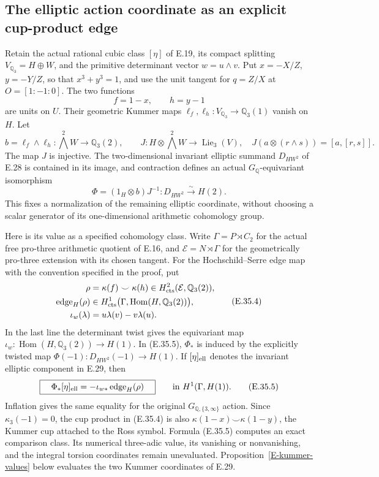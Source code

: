 \subsection{The elliptic action coordinate as an explicit cup-product edge}

\begin{proposition}
\label{E-ross-edge}
Retain the actual rational cubic class $[\eta]$ of
E.19, its compact splitting $V_{\mathbb Q_3}=H\oplus W$,
and the primitive determinant vector $w=u\wedge v$.
Put $x=-X/Z$, $y=-Y/Z$, so that $x^3+y^3=1$, and
use the unit tangent for $q=Z/X$ at $O=[1:-1:0]$.
The two functions
\[
 f=1-x,\qquad h=y-1
 \tag{E.35.1}
\]
are units on $U$. Their geometric Kummer maps
$\ell_f,\ell_h:V_{\mathbb Q_3}\to\mathbb Q_3(1)$
vanish on $H$. Let
\[
 b=\ell_f\wedge\ell_h:
       \bigwedge^2W\longrightarrow\mathbb Q_3(2),
 \qquad
 J:H\otimes\bigwedge^2W\longrightarrow\operatorname{Lie}_3(V),
 \quad J(a\otimes(r\wedge s))=[a,[r,s]].
 \tag{E.35.2}
\]
The map $J$ is injective. The two-dimensional invariant
elliptic summand $D_{HW^2}$ of E.28 is contained in its
image, and contraction defines an actual
$G_{\mathbb Q}$-equivariant isomorphism
\[
 \Phi=(1_H\otimes b)J^{-1}:
       D_{HW^2}\xrightarrow{\sim}H(2).
 \tag{E.35.3}
\]
This fixes a normalization of the remaining elliptic
coordinate, without choosing a scalar generator of its
one-dimensional arithmetic cohomology group.

Here is its value as a specified cohomology class.
Write $\Gamma=P\rtimes C_2$ for the actual free
pro-three arithmetic quotient of E.16, and
$\mathcal E=N\rtimes\Gamma$ for the geometrically
pro-three extension with its chosen tangent.
For the Hochschild--Serre edge map with the convention
specified in the proof, put
\[
 \begin{aligned}
 \rho&=\kappa(f)\smile\kappa(h)
              \in H^2_{\rm cts}(\mathcal E,\mathbb Q_3(2)),\\
 \operatorname{edge}_H(\rho)&\in
 H^1_{\rm cts}\bigl(\Gamma,
                   \operatorname{Hom}(H,\mathbb Q_3(2))\bigr),\\
 \iota_w(\lambda)&=u\lambda(v)-v\lambda(u).
 \end{aligned}
 \tag{E.35.4}
\]
In the last line the determinant twist gives the
equivariant map
$\iota_w:\operatorname{Hom}(H,\mathbb Q_3(2))\to H(1)$.
In (E.35.5), $\Phi_*$ is induced by the explicitly
twisted map $\Phi(-1):D_{HW^2}(-1)\to H(1)$.
If $[\eta]_{\rm ell}$ denotes the invariant elliptic
component in E.29, then
\[
 \boxed{\quad
  \Phi_*[\eta]_{\rm ell}
      =-\iota_{w*}\operatorname{edge}_H(\rho)
       \quad}\qquad\text{in }H^1(\Gamma,H(1)).
 \tag{E.35.5}
\]
Inflation gives the same equality for the original
$G_{\mathbb Q,\{3,\infty\}}$ action. Since
$\kappa_3(-1)=0$, the cup product in (E.35.4) is
also $\kappa(1-x)\smile\kappa(1-y)$, the Kummer
cup attached to the Ross symbol.
Formula (E.35.5) computes an exact comparison class.
Its numerical three-adic value, its vanishing or
nonvanishing, and the integral torsion coordinates
remain unevaluated. Proposition~\ref{E-kummer-values}
below evaluates the two Kummer coordinates of E.29.
\end{proposition}

